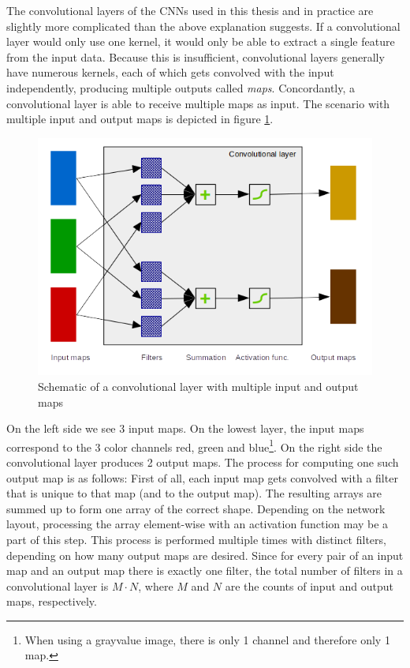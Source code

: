 \documentclass[11pt, a4paper]{article}
\begin{document}
The convolutional layers of the CNNs used in this thesis and in practice are slightly more complicated than the above explanation suggests. If a convolutional layer would only use one kernel, it would only be able to extract a single feature from the input data. Because this is insufficient, convolutional layers generally have numerous kernels, each of which gets convolved with the input independently, producing multiple outputs called \emph{maps}. Concordantly, a convolutional layer is able to receive multiple maps as input. The scenario with multiple input and output maps is depicted in figure \ref{fig:convolutional-layer-maps}.

\begin{figure}[h!tb]
	\centering
	\includegraphics{images/convolution_layer_maps.png}
	\caption[Input and output maps in convolutional layers]{Schematic of a convolutional layer with multiple input and output maps}
	\label{fig:convolutional-layer-maps}
\end{figure}

On the left side we see 3 input maps. On the lowest layer, the input maps correspond to the 3 color channels red, green and blue\footnote{When using a grayvalue image, there is only 1 channel and therefore only 1 map.}. On the right side the convolutional layer produces 2 output maps. The process for computing one such output map is as follows: First of all, each input map gets convolved with a filter that is unique to that map (and to the output map). The resulting arrays are summed up to form one array of the correct shape. Depending on the network layout, processing the array element-wise with an activation function may be a part of this step. This process is performed multiple times with distinct filters, depending on how many output maps are desired. Since for every pair of an input map and an output map there is exactly one filter, the total number of filters in a convolutional layer is $M \cdot N$, where $M$ and $N$ are the counts of input and output maps, respectively.
\end{document}
